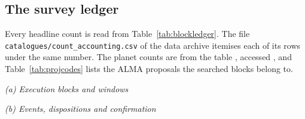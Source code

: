 \subsection{The survey ledger}

Every headline count is read from Table~\ref{tab:blockledger}. The file
\texttt{catalogues/\allowbreak count\_accounting.csv} of the data archive
itemises each of its rows under the same number. The planet counts are
from the \SfHostCatalogue{} \SfHostTable{} table \citep{NEA2013}, accessed
\SfHostDate, and Table~\ref{tab:projcodes} lists the ALMA proposals the
searched blocks belong to.

\begin{table}
\centering
\scriptsize
\caption{\textbf{The survey ledger}: (a)~execution blocks and windows, hours
being window-hours, so the classes partition the hours as they partition the
windows; (b)~events, dispositions and confirmation. Each sub-row is a subset
of the row its number extends, and a row whose note names sub-rows is their
sum.}
\label{tab:blockledger}
\textit{(a) Execution blocks and windows}\par\smallskip

\par\medskip
\textit{(b) Events, dispositions and confirmation}\par\smallskip

\end{table}

\begin{table}
\centering
\scriptsize
\caption{\textbf{The \NProjCodes{} ALMA proposals the searched blocks belong
to}, as \mbox{ADS/JAO.ALMA\#\textit{code}}. Every census block belongs to
one.\ProjCodeUnresClause}
\label{tab:projcodes}

\end{table}
